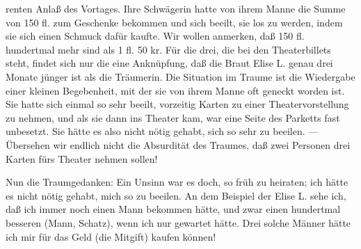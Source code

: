 \documentclass[twoside=true,titlepage=false,open=any, parskip=never, fontsize=10pt, headings=small, chapterprefix=false, appendixprefix=false]{scrbook}
\begin{document}
         
            
            
            
        \pstart
        renten Anlaß des Vortages. Ihre Schwägerin hatte von ihrem Manne die
               Summe von 150 fl. zum Geschenke bekommen und sich beeilt, sie los zu werden, indem sie sich einen Schmuck dafür kaufte.
               Wir wollen anmerken, daß 150 fl. hundertmal mehr sind als 1 fl. 50 kr. Für die
                  drei, die bei den Theaterbillets steht,
               findet sich nur die eine Anknüpfung, daß die Braut Elise L. genau drei Monate jünger ist als die Träumerin. Die Situation im Traume ist die Wiedergabe einer kleinen Begebenheit, mit
               der sie von ihrem Manne oft geneckt worden ist. Sie hatte sich einmal so sehr
                  beeilt, vorzeitig Karten zu einer Theatervorstellung zu nehmen, und als sie dann ins Theater kam, war eine Seite des Parketts fast unbesetzt. Sie hätte
               es also nicht nötig gehabt, sich so sehr zu
                  beeilen. — Übersehen wir endlich nicht die Absurdität des Traumes, daß zwei Personen drei
               Karten fürs Theater nehmen sollen!
        \pend
    
            
        \pstart
        Nun die Traumgedanken: Ein Unsinn war es doch, so
               früh zu heiraten; ich hätte es nicht nötig gehabt,
                  mich so zu beeilen. An dem Beispiel der Elise L. sehe ich, daß ich immer
               noch einen Mann bekommen hätte, und zwar einen hundertmal besseren (Mann,
               Schatz), wenn ich nur gewartet hätte.
               Drei solche Männer hätte ich mir für das Geld (die
               Mitgift) kaufen können!
        \pend
    
         
            
            
            \pstart{}\pend
            
\end{document}
